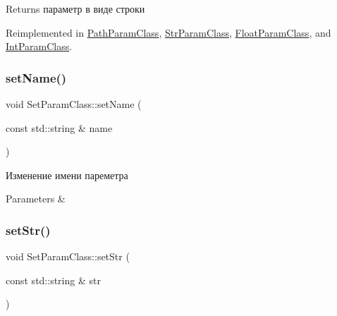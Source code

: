 \begin{DoxyReturn}{Returns}
параметр в виде строки 
\end{DoxyReturn}


Reimplemented in \hyperlink{class_path_param_class_ae5ab6701e81608546f1d0c1495355c05}{Path\+Param\+Class}, \hyperlink{class_str_param_class_a8a10ac8f8780d0d66099ba24245487ea}{Str\+Param\+Class}, \hyperlink{class_float_param_class_abe97aa2885386ef60127abe9ca0df8a4}{Float\+Param\+Class}, and \hyperlink{class_int_param_class_a63e23466747d1303a7ed40fd23edbbb1}{Int\+Param\+Class}.

\mbox{\label{class_set_param_class_aeabf85ad5a078ab4abb8f09a67f2c8e0}} 
\subsubsection{\texorpdfstring{set\+Name()}{setName()}}
{\footnotesize\ttfamily void Set\+Param\+Class\+::set\+Name (\begin{DoxyParamCaption}\item[{const std\+::string \&}]{name }\end{DoxyParamCaption})}



Изменение имени пареметра 


\begin{DoxyParams}{Parameters}
{\em } & \\
\hline
\end{DoxyParams}
\mbox{\label{class_set_param_class_aabba4e8a9b148582f40486e662408bf9}} 
\subsubsection{\texorpdfstring{set\+Str()}{setStr()}}
{\footnotesize\ttfamily void Set\+Param\+Class\+::set\+Str (\begin{DoxyParamCaption}\item[{const std\+::string \&}]{str }\end{DoxyParamCaption})\hspace{0.3cm}{\ttfamily [virtual]}}



